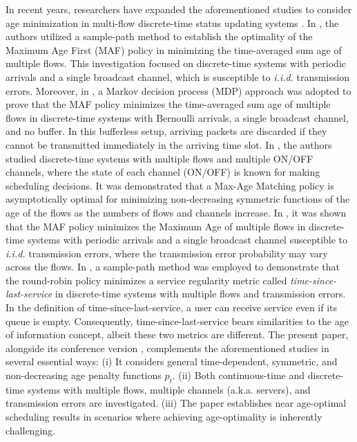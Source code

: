 In recent years, researchers have expanded the aforementioned studies to consider age minimization in multi-flow discrete-time status updating systems  \cite{IgorAllerton2016,HsuTWC2017,Vishrant2017,Arunabh2019}. In \cite{IgorAllerton2016}, the authors utilized a sample-path method to establish the optimality of the Maximum Age First (MAF) policy in minimizing the time-averaged sum age of multiple flows. This investigation focused on discrete-time systems with periodic arrivals and a single broadcast channel, which is susceptible to \emph{i.i.d.} transmission errors.
Moreover, in \cite{HsuTWC2017}, a Markov decision process (MDP) approach was adopted to prove that the MAF policy minimizes the time-averaged sum age of multiple flows in discrete-time systems with Bernoulli arrivals, a single broadcast channel, and no buffer. In this bufferless setup, arriving packets are discarded if they cannot be transmitted immediately in the arriving time slot. In \cite{Vishrant2017}, the authors studied discrete-time systems with multiple flows and multiple ON/OFF channels, where the state of each channel (ON/OFF) is known for making scheduling decisions. It was demonstrated that a Max-Age Matching policy is asymptotically optimal for minimizing non-decreasing symmetric functions of the age of the flows as the numbers of flows and channels increase. In \cite{Arunabh2019}, it was shown that the MAF policy minimizes the Maximum Age of multiple flows in discrete-time systems with periodic arrivals and a single broadcast channel susceptible to \emph{i.i.d.} transmission errors, where the transmission error probability may vary across the flows. In \cite{Ruogu2013}, a sample-path method was employed to demonstrate that the round-robin policy minimizes a service regularity metric called \emph{time-since-last-service} in discrete-time systems with multiple flows and transmission errors. In the definition of time-since-last-service, a user can receive service even if its queue is empty. Consequently, time-since-last-service bears similarities to the age of information concept, albeit these two metrics are different. 
The present paper, alongside its conference version \cite{SunAoIWorkshop2018}, complements the aforementioned studies in several essential ways: (i) It considers general time-dependent, symmetric, and non-decreasing age penalty functions $p_t$. (ii) Both continuous-time and discrete-time systems with multiple flows, multiple channels (a.k.a. servers), and transmission errors are investigated. (iii) The paper establishes near age-optimal scheduling results in scenarios where achieving age-optimality is inherently challenging.












